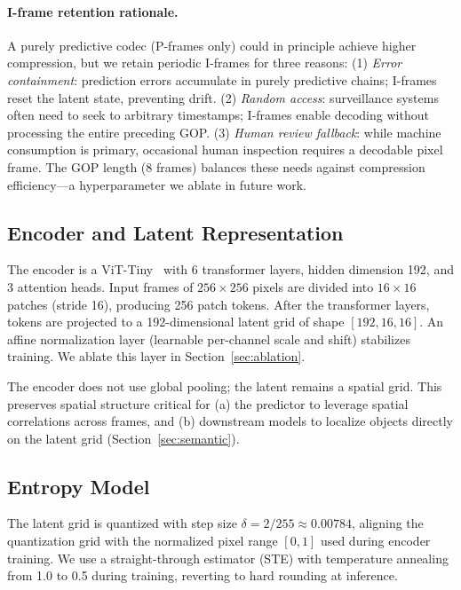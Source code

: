 \documentclass{article}
\begin{document}
\paragraph{I-frame retention rationale.}
A purely predictive codec (P-frames only) could in principle achieve higher compression, but we retain periodic I-frames for three reasons: (1) \textit{Error containment}: prediction errors accumulate in purely predictive chains; I-frames reset the latent state, preventing drift. (2) \textit{Random access}: surveillance systems often need to seek to arbitrary timestamps; I-frames enable decoding without processing the entire preceding GOP. (3) \textit{Human review fallback}: while machine consumption is primary, occasional human inspection requires a decodable pixel frame. The GOP length (8 frames) balances these needs against compression efficiency---a hyperparameter we ablate in future work.

\subsection{Encoder and Latent Representation}

The encoder is a ViT-Tiny~\cite{dosovitskiy2021vit,touvron2021deit} with 6 transformer layers, hidden dimension 192, and 3 attention heads. Input frames of $256 \times 256$ pixels are divided into $16 \times 16$ patches (stride 16), producing 256 patch tokens. After the transformer layers, tokens are projected to a 192-dimensional latent grid of shape $[192, 16, 16]$. An affine normalization layer (learnable per-channel scale and shift) stabilizes training. We ablate this layer in Section~\ref{sec:ablation}.

The encoder does not use global pooling; the latent remains a spatial grid. This preserves spatial structure critical for (a) the predictor to leverage spatial correlations across frames, and (b) downstream models to localize objects directly on the latent grid (Section~\ref{sec:semantic}).

\subsection{Entropy Model}

The latent grid is quantized with step size $\delta = 2/255 \approx 0.00784$, aligning the quantization grid with the normalized pixel range $[0,1]$ used during encoder training. We use a straight-through estimator (STE) with temperature annealing from 1.0 to 0.5 during training, reverting to hard rounding at inference.
\end{document}

